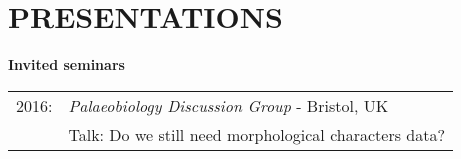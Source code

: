 \documentclass[10pt,a4paper]{article}
\begin{document}
{\bigskip
\section{PRESENTATIONS}

\raggedright\textbf{Invited seminars}\\[1.5ex]
\begin{tabular}{ll}
2016: & \textit{Palaeobiology Discussion Group} - Bristol, UK\\
& Talk: Do we still need morphological characters data?\\ 
\end{tabular}

\bigskip

}
\end{document}
